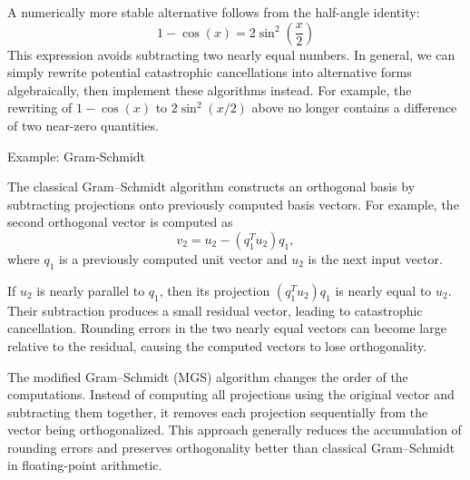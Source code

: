 \documentclass{ximera}
\begin{document}
A numerically more stable alternative follows from the
half-angle identity:
\[
\boxed{
1 - \cos(x) = 2\sin^2\left(\frac{x}{2}\right)
}
\]
This expression avoids subtracting two nearly equal numbers.  In general, we can simply rewrite potential catastrophic cancellations into alternative forms algebraically, then implement these algorithms instead.  For example, the rewriting of $1-\cos(x)$ to $2 \sin^2(x/2)$ above no longer contains a difference of two near-zero quantities.

Example: Gram-Schmidt

The classical Gram--Schmidt algorithm constructs an orthogonal
basis by subtracting projections onto previously computed basis
vectors. For example, the second orthogonal vector is computed as
\[
v_2 = u_2 - (q_1^T u_2)q_1,
\]
where \(q_1\) is a previously computed unit vector and \(u_2\)
is the next input vector.

If \(u_2\) is nearly parallel to \(q_1\), then its projection
\((q_1^T u_2)q_1\) is nearly equal to \(u_2\). Their subtraction
produces a small residual vector, leading to catastrophic cancellation.
Rounding errors in the two nearly equal vectors can become large relative to the residual, causing the computed vectors to lose
orthogonality.

The modified Gram--Schmidt (MGS) algorithm changes the order of
the computations. Instead of computing all projections using
the original vector and subtracting them together, it removes each projection sequentially from the vector being orthogonalized.  This approach generally reduces the accumulation of rounding errors and preserves orthogonality better than classical Gram--Schmidt in floating-point arithmetic.




\end{document}
